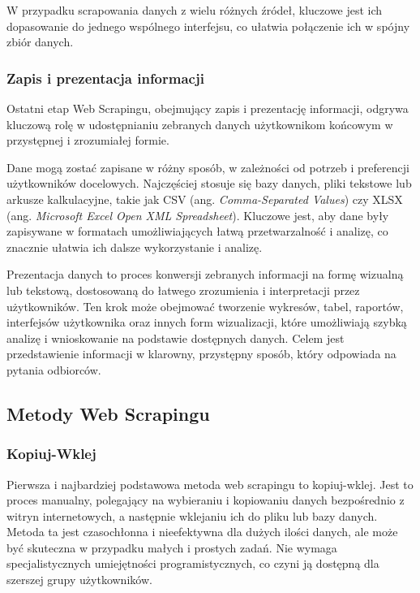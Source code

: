 \noindent W przypadku scrapowania danych z wielu różnych źródeł, kluczowe jest ich dopasowanie do jednego wspólnego interfejsu, co ułatwia połączenie ich w spójny zbiór danych.

\subsubsection{Zapis i prezentacja informacji}

Ostatni etap Web Scrapingu, obejmujący zapis i prezentację informacji, odgrywa kluczową rolę w udostępnianiu zebranych danych użytkownikom końcowym w przystępnej i zrozumiałej formie\cite{iee-state-of-the-art}.

Dane mogą zostać zapisane w różny sposób, w zależności od potrzeb i preferencji użytkowników docelowych.
Najczęściej stosuje się bazy danych, pliki tekstowe lub arkusze kalkulacyjne, takie jak CSV (ang. \emph{Comma-Separated Values}) czy XLSX (ang. \emph{Microsoft Excel Open XML Spreadsheet}).
Kluczowe jest, aby dane były zapisywane w formatach umożliwiających łatwą przetwarzalność i analizę, co znacznie ułatwia ich dalsze wykorzystanie i analizę\cite{iee-state-of-the-art}.

Prezentacja danych to proces konwersji zebranych informacji na formę wizualną lub tekstową, dostosowaną do łatwego zrozumienia i interpretacji przez użytkowników.
Ten krok może obejmować tworzenie wykresów, tabel, raportów, interfejsów użytkownika oraz innych form wizualizacji, które umożliwiają szybką analizę i wnioskowanie na podstawie dostępnych danych.
Celem jest przedstawienie informacji w klarowny, przystępny sposób, który odpowiada na pytania odbiorców.

\subsection{Metody Web Scrapingu}\label{subsec:web-scraping-methods}

\subsubsection{Kopiuj-Wklej}

Pierwsza i najbardziej podstawowa metoda web scrapingu to kopiuj-wklej.
Jest to proces manualny, polegający na wybieraniu i kopiowaniu danych bezpośrednio z witryn internetowych, a następnie wklejaniu ich do pliku lub bazy danych.
Metoda ta jest czasochłonna i nieefektywna dla dużych ilości danych, ale może być skuteczna w przypadku małych i prostych zadań\cite{state-of-art}.
Nie wymaga specjalistycznych umiejętności programistycznych, co czyni ją dostępną dla szerszej grupy użytkowników.

